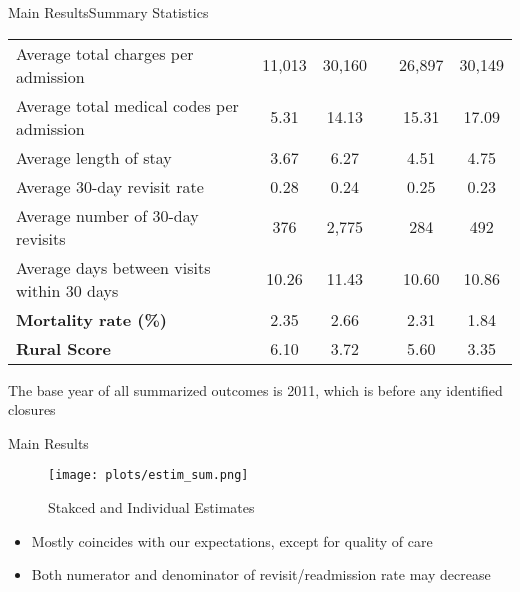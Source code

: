 \documentclass{beamer}
\theoremstyle{definition}
\begin{document}
\begin{frame}{Main Results}{Summary Statistics}
\begin{table}[t]
{\begin{tabular}{l@{\hskip 10pt}cc@{\hskip 15pt}c@{\hskip 10pt}cc}
Average total charges per admission        & 11,013    & 30,160   &  & 26,897    & 30,149   \\
Average total medical codes per admission  & 5.31      & 14.13    &  & 15.31     & 17.09    \\
Average length of stay                     & 3.67      & 6.27     &  & 4.51      & 4.75     \\
Average 30-day revisit rate                & 0.28      & 0.24     &  & 0.25      & 0.23     \\
Average number of 30-day revisits          & 376       & 2,775    &  & 284       & 492      \\
Average days between visits within 30 days & 10.26     & 11.43    &  & 10.60     & 10.86    \\
\textbf{Mortality rate (\%) }                       & 2.35      & 2.66     &  & 2.31      & 1.84     \\
\textbf{Rural Score }                               & 6.10      & 3.72     &  & 5.60      & 3.35     \\
\bottomrule
\bottomrule
\end{tabular}%
}
\parbox{0.97\textwidth}{%
    \scriptsize 
    The base year of all summarized outcomes is 2011, which is before any identified closures
}
\end{table}



    
\end{frame}


\begin{frame}{Main Results}

\begin{figure}[t]
    \centering
    \texttt{[image: plots/estim\_sum.png]}
    \caption{Stakced and Individual Estimates}
    \label{fig:estim_sum}
\end{figure}
\vspace{-0.5cm}
\begin{itemize}
    \item Mostly coincides with our expectations, except for quality of care
    \item Both numerator and denominator of revisit/readmission rate may decrease %
\end{itemize}
\end{frame}
\end{document}

